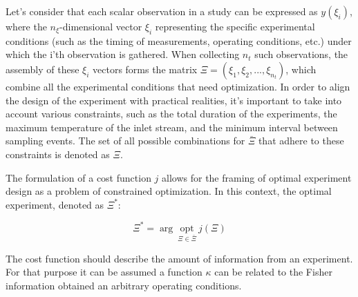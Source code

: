 \documentclass[../Article_Design_of_Experiment.tex]{subfiles}
\begin{document}
	
	Let's consider that each scalar observation in a study can be expressed as $y(\xi_i)$, where the $n_\xi$-dimensional vector $\xi_i$ representing the specific experimental conditions (such as the timing of measurements, operating conditions, etc.) under which the i'th observation is gathered. When collecting $n_t$ such observations, the assembly of these $\xi_i$ vectors forms the matrix $\Xi = (\xi_1, \xi_2,..., \xi_{n_t})$, which combine all the experimental conditions that need optimization. In order to align the design of the experiment with practical realities, it's important to take into account various constraints, such as the total duration of the experiments, the maximum temperature of the inlet stream, and the minimum interval between sampling events. The set of all possible combinations for $\bar{\Xi}$ that adhere to these constraints is denoted as $\Xi$.
	
	
	The formulation of a cost function $j$ allows for the framing of optimal experiment design as a problem of constrained optimization. In this context, the optimal experiment, denoted as $\Xi^*$:
	
	{\footnotesize
	\begin{equation}
		\Xi^* = \arg~\underset{\Xi \in \bar{\Xi}}{\text{opt}}~j\left(\Xi\right)
	\end{equation} }
	
	The cost function should describe the amount of information from an experiment. For that purpose it can be assumed a function $\kappa$ can be related to the Fisher information obtained an arbitrary operating conditions.
	
\end{document}
